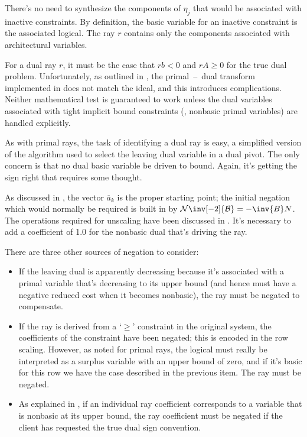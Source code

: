 There's no need to synthesize the components of $\eta_j$ that would be
associated with inactive constraints.
By definition, the basic variable for an inactive constraint is the associated
logical.
The ray $r$ contains only the components associated with architectural
variables.

For a dual ray $r$, it must be the case that $rb < 0$ and $rA \geq 0$ for the
true dual problem.
Unfortunately, as outlined in , the primal~--~dual
transform implemented in \dylp does not match the ideal, and this introduces
complications.
Neither mathematical test is guaranteed to work unless the dual variables
associated with tight implicit bound constraints (\ie, nonbasic primal
variables) are handled explicitly.

As with primal rays, the task of identifying a dual ray is easy, a simplified
version of the algorithm used to select the leaving dual variable in a dual
pivot.
The only concern is that no dual basic variable be driven to bound.
Again, it's getting the sign right that requires some thought.

As discussed in , the vector $\overline{a}_k$ is the
proper starting point; the initial negation which would normally be required is
built in by $\mathcal{N}\inv[-2]{\mathcal{B}} = -\inv{B}N$.
The operations required for unscaling have been discussed in
.
It's necessary to add a coefficient of 1.0 for the nonbasic dual that's
driving the ray.

There are three other sources of negation to consider:
\begin{itemize}
  \item
  If the leaving dual is apparently decreasing because it's associated with a
  primal variable that's decreasing to its upper bound (and hence must have a
  negative reduced cost when it becomes nonbasic), the ray must be negated
  to compensate.

  \item
  If the ray is derived from a `$\geq$' constraint in the original system,
  the coefficients of the constraint have been negated; this is encoded in the
  row scaling.
  However, as noted for primal rays, the logical must really be interpreted as
  a surplus variable with an upper bound of zero, and if it's basic for this
  row we have the case described in the previous item.
  The ray must be negated.

  \item
  As explained in ,
  if an individual ray coefficient corresponds to a variable that is nonbasic
  at its upper bound, the ray coefficient must be negated if the client has
  requested the true dual sign convention.
\end{itemize}


